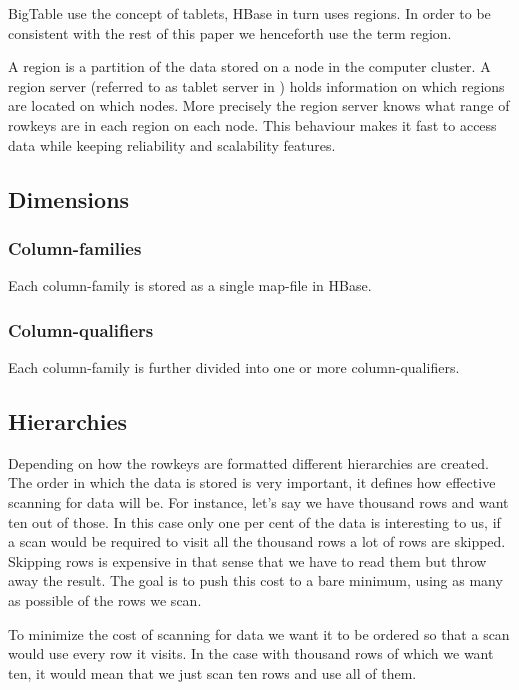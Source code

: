 \documentclass[a4paper,10pt]{book}
\begin{document}
BigTable use the concept of tablets, HBase in turn uses regions. In order
to be consistent with the rest of this paper we henceforth use the term
region.

A region is a partition of the data stored on a node in the computer
cluster. A region server (referred to as tablet server in \cite{bigtable})
holds information on which regions are located on which nodes. More
precisely the region server knows what range of rowkeys are in each region
on each node. This behaviour makes it fast to access data while keeping
reliability and scalability features.


\subsection{Dimensions}

\subsubsection{Column-families}

Each column-family is stored as a single map-file in HBase.


\subsubsection{Column-qualifiers}

Each column-family is further divided into one or more column-qualifiers.


\subsection{Hierarchies}

Depending on how the rowkeys are formatted different hierarchies are
created. The order in which the data is stored is very important, it
defines how effective scanning for data will be. For instance, let's say
we have thousand rows and want ten out of those. In this case only one per
cent of the data is interesting to us, if a scan would be required to
visit all the thousand rows a lot of rows are skipped. Skipping rows is
expensive in that sense that we have to read them but throw away the
result. The goal is to push this cost to a bare minimum, using as many as
possible of the rows we scan.

To minimize the cost of scanning for data we want it to be ordered so that
a scan would use every row it visits. In the case with thousand rows of
which we want ten, it would mean that we just scan ten rows and use all of
them.
\end{document}
